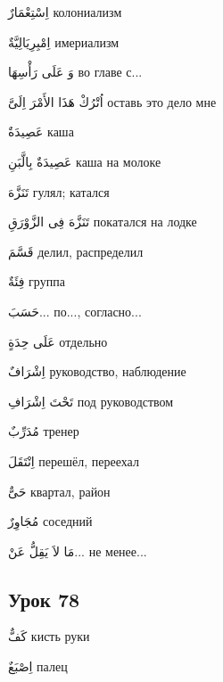 \documentclass[a5paper]{article}
\newcommand\textstyleDropCaps[1]{#1}
\newcommand\textstyleCaptioncharacters[1]{#1}
\begin{document}
\textstyleCaptioncharacters{اِسْتِعْمَارٌ }\textstyleDropCaps{колониализм‎}

\textstyleCaptioncharacters{اِمْبِرِيَالِيَّةٌ }\textstyleDropCaps{имериализм‎}

\textstyleCaptioncharacters{وَ عَلَى رَأْسِهَا }\textstyleDropCaps{во главе с...‎}

\textstyleCaptioncharacters{اُتْرُكْ هَذَا الأَمْرَ اِلَىَّ }\textstyleDropCaps{оставь это дело мне‎}

\textstyleCaptioncharacters{عَصِيدَةٌ }\textstyleDropCaps{каша‎}

\textstyleCaptioncharacters{عَصِيدَةٌ بِالَّبَنِ }\textstyleDropCaps{каша на молоке‎}

\textstyleCaptioncharacters{تَنَزَّهَ }\textstyleDropCaps{гулял; катался‎}

\textstyleCaptioncharacters{تَنَزَّهَ فِى الزَّوْرَقِ }\textstyleDropCaps{пока­тался на лодке‎}

\textstyleCaptioncharacters{قَسَّمَ }\textstyleDropCaps{делил, распределил‎}

\textstyleCaptioncharacters{فِئَةٌ }\textstyleDropCaps{группа‎}

\textstyleCaptioncharacters{حَسَبَ...ِ }\textstyleDropCaps{по..., согласно...‎}

\textstyleCaptioncharacters{عَلَى حِدَةٍ }\textstyleDropCaps{отдельно‎}

\textstyleCaptioncharacters{اِشْرَافٌ }\textstyleDropCaps{руководство, на­блюдение‎}

\textstyleCaptioncharacters{تَحْتَ اِشْرَافِ }\textstyleDropCaps{под руко­водством‎}

\textstyleCaptioncharacters{مُدَرِّبٌ }\textstyleDropCaps{тренер‎}

\textstyleCaptioncharacters{اِنْتَقَلَ }\textstyleDropCaps{перешёл, переехал‎}

\textstyleCaptioncharacters{حَىٌّ }\textstyleDropCaps{квартал, район‎}

\textstyleCaptioncharacters{مُجَاوِرٌ }\textstyleDropCaps{соседний‎}

\textstyleCaptioncharacters{مَا لاَ يَقِلُّ عَنْ...ِ }\textstyleDropCaps{не ме­нее...‎}

\subsection[Урок 78‎]{\textstyleDropCaps{Урок 78‎}}
\textstyleCaptioncharacters{كَفٌّ }\textstyleDropCaps{кисть руки‎}

\textstyleCaptioncharacters{اِصْبَعٌ }\textstyleDropCaps{палец‎}
\end{document}
